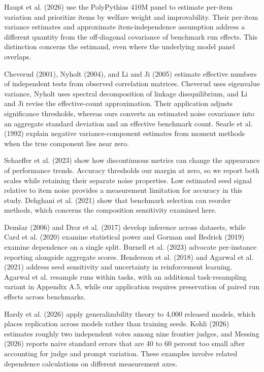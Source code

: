 Haupt et al. (2026) use the PolyPythias 410M panel to estimate per-item variation and prioritize items by welfare weight and improvability. Their per-item variance estimates and approximate item-independence assumption address a different quantity from the off-diagonal covariance of benchmark run effects. This distinction concerns the estimand, even where the underlying model panel overlaps.

Cheverud (2001), Nyholt (2004), and Li and Ji (2005) estimate effective numbers of independent tests from observed correlation matrices. Cheverud uses eigenvalue variance, Nyholt uses spectral decomposition of linkage disequilibrium, and Li and Ji revise the effective-count approximation. Their application adjusts significance thresholds, whereas ours converts an estimated noise covariance into an aggregate standard deviation and an effective benchmark count. Searle et al. (1992) explain negative variance-component estimates from moment methods when the true component lies near zero.

Schaeffer et al. (2023) show how discontinuous metrics can change the appearance of performance trends. Accuracy thresholds our margin at zero, so we report both scales while retaining their separate noise properties. Low estimated seed signal relative to item noise provides a measurement limitation for accuracy in this study. Dehghani et al. (2021) show that benchmark selection can reorder methods, which concerns the composition sensitivity examined here.

Dem\v{s}ar (2006) and Dror et al. (2017) develop inference across datasets, while Card et al. (2020) examine statistical power and Gorman and Bedrick (2019) examine dependence on a single split. Burnell et al. (2023) advocate per-instance reporting alongside aggregate scores. Henderson et al. (2018) and Agarwal et al. (2021) address seed sensitivity and uncertainty in reinforcement learning. Agarwal et al. resample runs within tasks, with an additional task-resampling variant in Appendix A.5, while our application requires preservation of paired run effects across benchmarks.

Hardy et al. (2026) apply generalizability theory to 4,000 released models, which places replication across models rather than training seeds. Kohli (2026) estimates roughly two independent votes among nine frontier judges, and Messing (2026) reports naive standard errors that are 40 to 60 percent too small after accounting for judge and prompt variation. These examples involve related dependence calculations on different measurement axes.

